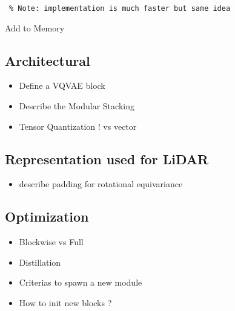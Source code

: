 \documentclass[colorinlistoftodos]{article} %
\begin{document}
\begin{minipage}{\textwidth}
\begin{minipage}{0.5\textwidth}
\begin{algorithm2e}[H]
{        \,\,\,\texttt{\% Note: implementation is much faster but same idea} \\
        
    }
    

 
 \caption{Add to Memory}
\label{algo:vqr}
\end{algorithm2e}
\end{minipage}
\end{minipage}



\subsection{Architectural}
\begin{itemize}
    \item Define a VQVAE block
    \item Describe the Modular Stacking 
    \item Tensor Quantization ! vs vector
\end{itemize}

\subsection{Representation used for LiDAR}
\begin{itemize}
    \item describe padding for rotational equivariance
\end{itemize}

\subsection{Optimization}
\begin{itemize}
    \item Blockwise vs Full
    \item Distillation
    \item Criterias to spawn a new module
    \item How to init new blocks ?
\end{itemize}
\end{document}
